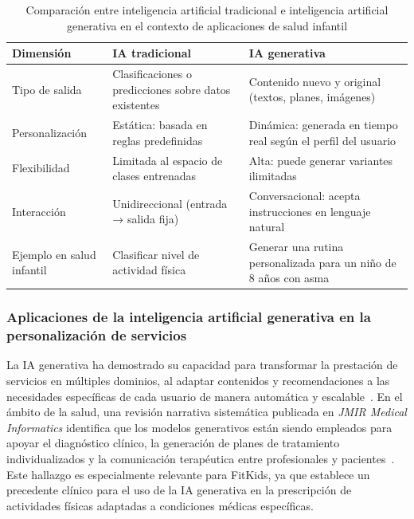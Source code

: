 					\begin{table}[H]
						\centering
						\caption[Comparación entre inteligencia artificial tradicional e inteligencia artificial generativa]{Comparación entre inteligencia artificial tradicional e inteligencia artificial generativa en el contexto de aplicaciones de salud infantil}
						\label{tab:ia_comparativa}
						
						\begin{tabular}{p{4.2cm} p{5.1cm} p{5.2cm}}
							\hline
							\textbf{Dimensión} & \textbf{IA tradicional} & \textbf{IA generativa} \\
							\hline
							Tipo de salida & Clasificaciones o predicciones sobre datos existentes & Contenido nuevo y original (textos, planes, imágenes) \\
							
							Personalización & Estática: basada en reglas predefinidas & Dinámica: generada en tiempo real según el perfil del usuario \\
							
							Flexibilidad & Limitada al espacio de clases entrenadas & Alta: puede generar variantes ilimitadas \\
							
							Interacción & Unidireccional (entrada → salida fija) & Conversacional: acepta instrucciones en lenguaje natural \\
							
							Ejemplo en salud infantil & Clasificar nivel de actividad física & Generar una rutina personalizada para un niño de 8 años con asma \\
							\hline
						\end{tabular}
					\end{table}
					\tblnote
				
				\subsubsection{Aplicaciones de la inteligencia artificial generativa en la personalización de servicios}
					La IA generativa ha demostrado su capacidad para transformar la prestación de servicios en múltiples dominios, al adaptar contenidos y recomendaciones a las necesidades específicas de cada usuario de manera automática y escalable~\cite{Sengar2024}. En el ámbito de la salud, una revisión narrativa sistemática publicada en \textit{JMIR Medical Informatics} identifica que los modelos generativos están siendo empleados para apoyar el diagnóstico clínico, la generación de planes de tratamiento individualizados y la comunicación terapéutica entre profesionales y pacientes~\cite{Yim2024}. Este hallazgo es especialmente relevante para FitKids, ya que establece un precedente clínico para el uso de la IA generativa en la prescripción de actividades físicas adaptadas a condiciones médicas específicas.
					
